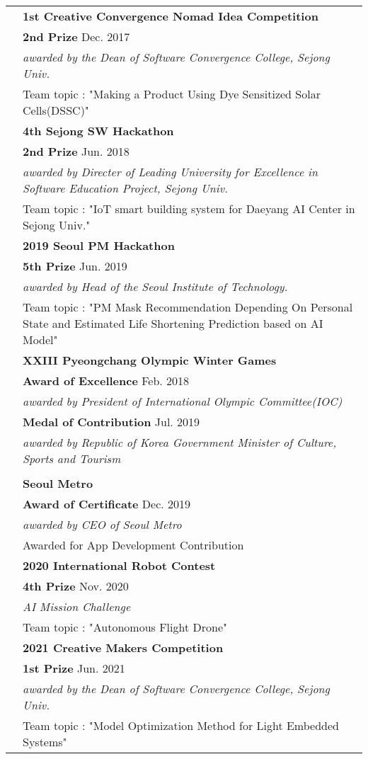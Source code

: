 \documentclass[letterpaper, 11pt]{article}
\begin{document}
\begin{longtable}{p{1.3in}p{4.8in}}
{\color{Violet}{Awards}} 
& {\textbf{1st Creative Convergence Nomad Idea Competition}} \\
& {\textbf{2nd Prize}} \hfill Dec. 2017 \\
& {\it awarded by the Dean of Software Convergence College, Sejong Univ.}  \\
& Team topic : "Making a Product Using Dye Sensitized Solar Cells(DSSC)"
& \\
& {\textbf{4th Sejong SW Hackathon}} \\
& {\textbf{2nd Prize}} \hfill Jun. 2018 \\
& {\it awarded by Directer of Leading University for Excellence in Software Education Project, Sejong Univ.}  \\
& Team topic : "IoT smart building system for Daeyang AI Center in Sejong Univ."
& \\
& {\textbf{2019 Seoul PM Hackathon}} \\
& {\textbf{5th Prize}} \hfill Jun. 2019 \\
& {\it awarded by Head of the Seoul Institute of Technology.}  \\
& Team topic : "PM Mask Recommendation Depending On Personal State and Estimated Life Shortening Prediction based on AI Model"
& \\
& {\textbf{XXIII Pyeongchang Olympic Winter Games}} \\
& {\textbf{Award of Excellence}} \hfill Feb. 2018 \\
& {\it awarded by President of International Olympic Committee(IOC)}  \\
& {\textbf{Medal of Contribution}} \hfill Jul. 2019 \\
& {\it awarded by Republic of Korea Government Minister of Culture, Sports and Tourism}  \\
& \\
& {\textbf{Seoul Metro}} \\
& {\textbf{Award of Certificate}} \hfill Dec. 2019 \\
& {\it awarded by CEO of Seoul Metro}  \\
& Awarded for App Development Contribution
& \\
& {\textbf{2020 International Robot Contest}} \\
& {\textbf{4th Prize}} \hfill Nov. 2020 \\
& {\it AI Mission Challenge}  \\
& Team topic : "Autonomous Flight Drone"
& \\
& {\textbf{2021 Creative Makers Competition}} \\
& {\textbf{1st Prize}} \hfill Jun. 2021 \\
& {\it awarded by the Dean of Software Convergence College, Sejong Univ.}  \\
& Team topic : "Model Optimization Method for Light Embedded Systems"
&\\


\end{longtable}
\end{document}
